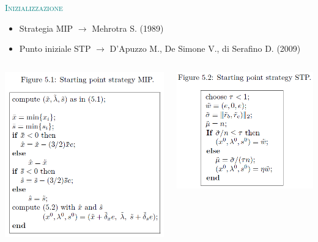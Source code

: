 \begin{frame}{\textcolor{teal}{\textsc{Inizializzazione}}}
	\begin{itemize}
		\item Strategia MIP \pause $\rightarrow$ Mehrotra S. \small{(1989)}
		\pause
		\item Punto iniziale STP \pause $\rightarrow$ D’Apuzzo M., De Simone V., di Serafino D. \small{(2009)}
	\end{itemize}
\pause
\begin{columns}
	\begin{column}{0.4\textwidth}
		\includegraphics[width=\columnwidth]{MIP.jpg}
	\end{column}
	\begin{column}{0.4\textwidth}
	\includegraphics[width=\columnwidth]{STP.jpg}
\end{column}
\end{columns}
\end{frame}

